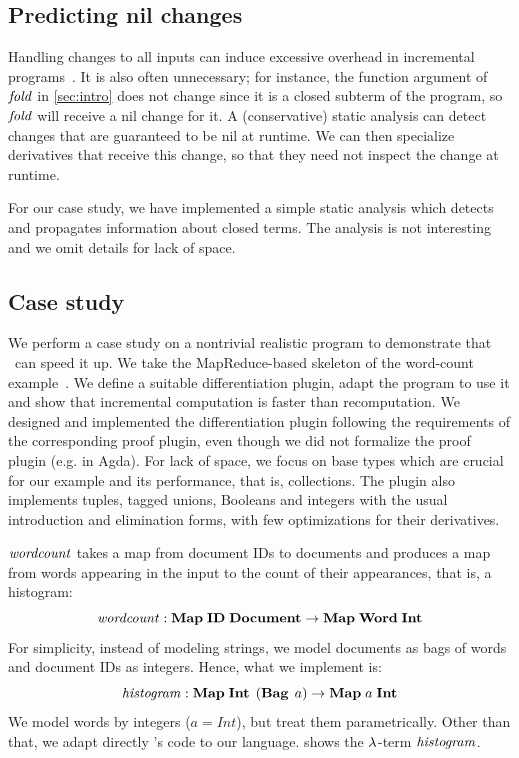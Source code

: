 \subsection{Predicting nil changes}
Handling changes to all inputs can induce excessive overhead in incremental
programs~\citep{Acar09}. It is also often
unnecessary; for instance, the function argument of $\mathit{fold}$ in 
\cref{sec:intro} does not change since it is a closed subterm of the program, so
$\mathit{fold}$ will receive a nil change for it.
A (conservative) static analysis can detect changes that are guaranteed to be nil at runtime. 
We can then specialize derivatives that receive this change, so that they need not
inspect the change at runtime.

For our case study, we have implemented a simple static analysis which
detects and propagates information about closed terms. The analysis is not interesting and 
we omit details for lack of space.





\subsection{Case study}
\label{sec:plugins}


We perform a case study on a nontrivial realistic program to
demonstrate that \ILC\ can speed it up.
We take the MapReduce-based skeleton of the
word-count example~\citep{Lammel07}. We define a
suitable differentiation plugin, adapt the program to use it and show
that incremental computation is faster than recomputation.
%
We designed and implemented the differentiation plugin 
following the requirements of the corresponding proof plugin,
even though we did not formalize
the proof plugin (e.g. in Agda).
For lack of space, we focus on base types
which are crucial for our example and its performance, that is,
collections.
%
The plugin also implements tuples, tagged unions, Booleans and
integers with the usual introduction and elimination forms, with
few optimizations for their derivatives.

$\mathit{wordcount}$ takes a map
from document IDs to documents and produces a map
from words appearing in the input to the count of their
appearances, that is, a histogram:
\[
\HasType \WORDCOUNT {\Fun {\HashMap \DOCUMENTID \DOCUMENT} {\HashMap \WORD \Int}}
\]
For simplicity, instead of modeling strings, we model documents
as bags of words and document IDs as integers. Hence, what we implement is:
\[
\HasType \HISTOGRAM {\Fun {\HashMap \Int {\Bag*[a]}} {\HashMap a \Int}}
\]
We model words by integers ($a = Int$), but treat them parametrically.
Other than that, we adapt directly
\citeauthor{Lammel07}'s code to our language.
 shows the $\lambda$-term
$\mathit{histogram}$.

